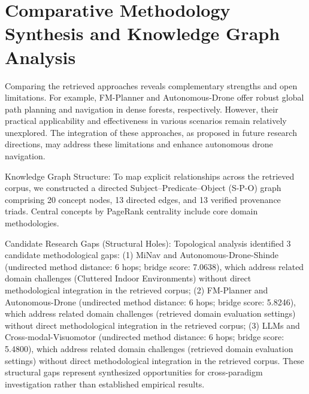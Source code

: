 \documentclass[10pt,twocolumn,letterpaper]{article}
\begin{document}
\section{Comparative Methodology Synthesis and Knowledge Graph Analysis}
Comparing the retrieved approaches reveals complementary strengths and open limitations. For example, FM-Planner and Autonomous-Drone offer robust global path planning and navigation in dense forests, respectively. However, their practical applicability and effectiveness in various scenarios remain relatively unexplored. The integration of these approaches, as proposed in future research directions, may address these limitations and enhance autonomous drone navigation.

Knowledge Graph Structure: To map explicit relationships across the retrieved corpus, we constructed a directed Subject–Predicate–Object (S-P-O) graph comprising 20 concept nodes, 13 directed edges, and 13 verified provenance triads. Central concepts by PageRank centrality include core domain methodologies.

Candidate Research Gaps (Structural Holes): Topological analysis identified 3 candidate methodological gaps: (1) MiNav and Autonomous-Drone-Shinde (undirected method distance: 6 hops; bridge score: 7.0638), which address related domain challenges (Cluttered Indoor Environments) without direct methodological integration in the retrieved corpus; (2) FM-Planner and Autonomous-Drone (undirected method distance: 6 hops; bridge score: 5.8246), which address related domain challenges (retrieved domain evaluation settings) without direct methodological integration in the retrieved corpus; (3) LLMs and Cross-modal-Visuomotor (undirected method distance: 6 hops; bridge score: 5.4800), which address related domain challenges (retrieved domain evaluation settings) without direct methodological integration in the retrieved corpus. These structural gaps represent synthesized opportunities for cross-paradigm investigation rather than established empirical results.
\end{document}
